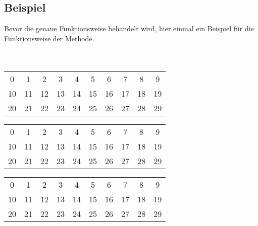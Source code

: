 \documentclass[12pt, a4paper, titlepage,twoside]{article}
\begin{document}
	\subsection{Beispiel}
	Bevor die genaue Funktionsweise behandelt wird, hier einmal ein Beispiel f\"ür die Funktionsweise der Methode.\\
	\ \\
	\ \\
	 \begin{table}[!ht] 
	 	\centering
	 	
	 		\begin{tabular}{|c|c|c|c|c|c|c|c|c|c|}
	 			\hline
	 			0  &  1 &  2 &  3 &  4 &  5 &  6 &  7 &  8 &  9 \\
	 			10 & 11 & 12 & 13 & 14 & 15 & 16 & 17 & 18 & 19 \\
	 			20 & 21 & 22 & 23 & 24 & 25 & 26 & 27 & 28 & 29 \\
	 			\hline
	 		\end{tabular}
	 		
	 		\vspace{8mm}
	 		\begin{tabular}{|c|c|c|c|c|c|c|c|c|c|}
	 			\hline
	 			 \cellcolor{red}0  &  \cellcolor{red}1 &  2 &  3 &  4 &  5 &  6 &  7 &  8 &  9 \\
	 			 10 & 11 & 12 & 13 & 14 & 15 & 16 & 17 & 18 & 19 \\
	 			 20 & 21 & 22 & 23 & 24 & 25 & 26 & 27 & 28 & 29 \\
	 			\hline
	 		\end{tabular}
	 		
			\vspace{8mm}
	 		\begin{tabular}{|c|c|c|c|c|c|c|c|c|c|}
	 			\hline
	 			 \cellcolor{red}0  & \cellcolor{red} 1 &  2 &  3 &  \cellcolor{red}4 &  5 & \cellcolor{red} 6 &  7 & \cellcolor{red} 8 &  9 \\
	 			 \cellcolor{red}10 & 11 & \cellcolor{red}12 & 13 & \cellcolor{red}14 & 15 & \cellcolor{red}16 & 17 & \cellcolor{red}18 & 19 \\
	 			 \cellcolor{red}20 & 21 & \cellcolor{red}22 & 23 & \cellcolor{red}24 & 25 & \cellcolor{red}26 & 27 & \cellcolor{red}28 & 29 \\
	 			 \hline
	 		\end{tabular}
	 		

\end{table}
\end{document}
